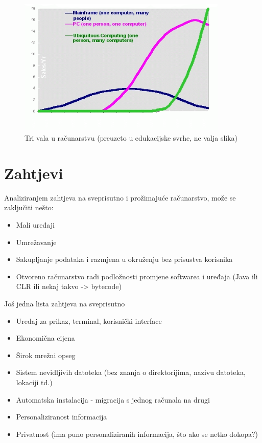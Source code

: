 \documentclass[times, utf8, diplomski, numeric]{fer}
\begin{document}
\begin{figure}[htb]
	\centering
	\includegraphics[width=10cm]{images/majortrends.png}
	\caption{Tri vala u računarstvu (preuzeto u edukacijske svrhe, ne valja slika)}
	\label{fig:majortrends}
\end{figure}

\section{Zahtjevi}
Analiziranjem zahtjeva na sveprisutno i prožimajuće računarstvo, može se
zaključiti nešto:
\begin{itemize}
  \item Mali uređaji
  \item Umrežavanje
  \item Sakupljanje podataka i razmjena u okruženju bez prisustva korisnika
  \item Otvoreno računarstvo radi podložnosti promjene softwarea i uređaja
  (Java ili CLR ili nekaj takvo -> bytecode)
\end{itemize}

Još jedna lista zahtjeva na sveprisutno
\begin{itemize}
  \item Uređaj za prikaz, terminal, korisnički interface
  \item Ekonomična cijena
  \item Širok mrežni opseg
  \item Sistem nevidljivih datoteka (bez znanja o direktorijima, nazivu
  datoteka, lokaciji td.)
  \item Automatska instalacija - migracija s jednog računala na drugi
  \item Personaliziranost informacija
  \item Privatnost (ima puno personaliziranih informacija, što ako se netko
  dokopa?)
\end{itemize}
\end{document}
